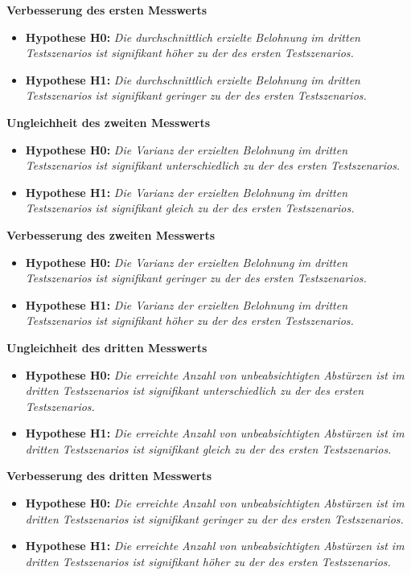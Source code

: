 \textbf{Verbesserung des ersten Messwerts}
\begin{itemize}
    \item \textbf{Hypothese H0:} \textit{Die durchschnittlich erzielte Belohnung im dritten Testszenarios ist signifikant höher zu der des ersten Testszenarios.}
    \item \textbf{Hypothese H1:} \textit{Die durchschnittlich erzielte Belohnung im dritten Testszenarios ist signifikant geringer zu der des ersten Testszenarios.}
\end{itemize}

\textbf{Ungleichheit des zweiten Messwerts}
\begin{itemize}
    \item \textbf{Hypothese H0:} \textit{Die Varianz der erzielten Belohnung im dritten Testszenarios ist signifikant unterschiedlich zu der des ersten Testszenarios.}
    \item \textbf{Hypothese H1:} \textit{Die Varianz der erzielten Belohnung im dritten Testszenarios ist signifikant gleich zu der des ersten Testszenarios.}
\end{itemize}

\textbf{Verbesserung des zweiten Messwerts}
\begin{itemize}
    \item \textbf{Hypothese H0:} \textit{Die Varianz der erzielten Belohnung im dritten Testszenarios ist signifikant geringer zu der des ersten Testszenarios.}
    \item \textbf{Hypothese H1:} \textit{Die Varianz der erzielten Belohnung im dritten Testszenarios ist signifikant höher zu der des ersten Testszenarios.}
\end{itemize}

\textbf{Ungleichheit des dritten Messwerts}
\begin{itemize}
    \item \textbf{Hypothese H0:} \textit{Die erreichte Anzahl von unbeabsichtigten Abstürzen ist im dritten Testszenarios ist signifikant unterschiedlich zu der des ersten Testszenarios.}
    \item \textbf{Hypothese H1:} \textit{Die erreichte Anzahl von unbeabsichtigten Abstürzen ist im dritten Testszenarios ist signifikant gleich zu der des ersten Testszenarios.}
\end{itemize}

\textbf{Verbesserung des dritten Messwerts}
\begin{itemize}
    \item \textbf{Hypothese H0:} \textit{Die erreichte Anzahl von unbeabsichtigten Abstürzen ist im dritten Testszenarios ist signifikant geringer zu der des ersten Testszenarios.}
    \item \textbf{Hypothese H1:} \textit{Die erreichte Anzahl von unbeabsichtigten Abstürzen ist im dritten Testszenarios ist signifikant höher zu der des ersten Testszenarios.}
\end{itemize}

